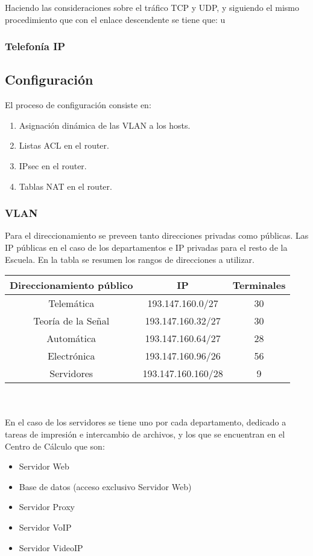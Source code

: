 \documentclass[a4paper,10pt]{article}
\begin{document}
Haciendo las consideraciones sobre el tráfico TCP y UDP, y siguiendo el mismo procedimiento que con el enlace descendente se tiene que:
u
\subsubsection{Telefon\'ia IP}
\subsection{Configuraci\'on}
El proceso de configuración consiste en:
\begin{enumerate}
	\item Asignaci\'on din\'amica de las VLAN a los hosts.
	\item Listas ACL en el router.
	\item IPsec en el router.
	\item Tablas NAT en el router.
\end{enumerate}
\subsubsection{VLAN}
Para el direccionamiento se preveen tanto direcciones privadas como públicas. Las IP públicas en el caso de los departamentos e IP privadas para el resto de la Escuela. En la tabla se resumen los rangos de direcciones a utilizar.\\

\begin{tabular}{|c|c|c|}
\hline \textbf{Direccionamiento público} & IP & Terminales \\ 
\hline Telemática & 193.147.160.0/27 & 30 \\ 
\hline Teoría de la Señal & 193.147.160.32/27 & 30 \\ 
\hline Automática & 193.147.160.64/27 & 28 \\ 
\hline Electrónica & 193.147.160.96/26  & 56 \\ 
\hline Servidores & 193.147.160.160/28 & 9 \\ 
\hline 
\end{tabular} \\ \\

En el caso de los servidores se tiene uno por cada departamento, dedicado a tareas de impresión e intercambio de archivos, y los que se encuentran en el Centro de Cálculo que son:
\begin{itemize}
	\item Servidor Web
	\item Base de datos (acceso exclusivo Servidor Web)
	\item Servidor Proxy
	\item Servidor VoIP
	\item Servidor VideoIP
\end{itemize}
\end{document}
